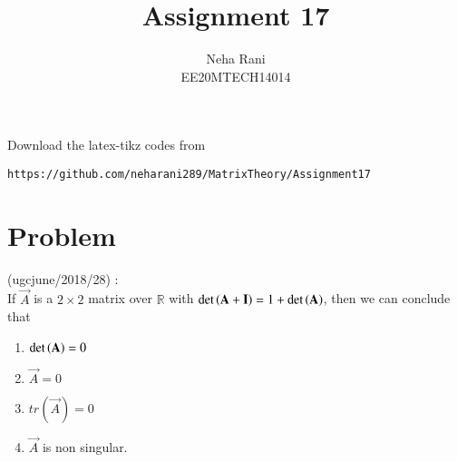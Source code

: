 \documentclass[journal,12pt]{IEEEtran}
\begin{document}
     \def\rightbox#1{\makebox[0in][r]{#1}}
     \def\centbox#1{\makebox[0in]{#1}}
     \def\topbox#1{\raisebox{-\baselineskip}[0in][0in]{#1}}
     \def\midbox#1{\raisebox{-0.5\baselineskip}[0in][0in]{#1}}
\vspace{3cm}
\title{Assignment 17}
\author{Neha Rani\\EE20MTECH14014}
\maketitle
\bigskip
\renewcommand{\thefigure}{\theenumi}
\renewcommand{\thetable}{\theenumi}
%
Download the latex-tikz codes from 
%
\begin{lstlisting}
https://github.com/neharani289/MatrixTheory/Assignment17
\end{lstlisting}
\section{\textbf{Problem}}
%
(ugcjune/2018/28) : \\

If $\vec{A}$ is a $2\times2$ matrix over $\mathbb{R}$ with $\det\left(\mathbf{A}+\mathbf{I}\right) = 1+\det\left(\mathbf{A}\right)$, then we can conclude that\\
\begin{enumerate}
    \item $\det\left(\mathbf{A}\right)=0$\\
    \item $\vec{A}=0$\\
    \item  $tr(\vec{A})=0$\\
    \item $\vec{A}$ is non singular.
\end{enumerate}
\end{document}
